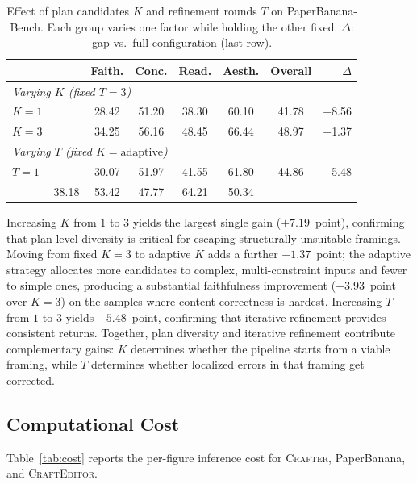\documentclass{article}
\newcommand{\Crafter}{\textsc{Crafter}\xspace}
\newcommand{\Editor}{\textsc{CraftEditor}\xspace}
\newcommand{\PaperBananaBench}{PaperBanana-Bench\xspace}
\begin{document}
\begin{table}[h]
\centering
\small
\caption{Effect of plan candidates $K$ and refinement rounds $T$ on \PaperBananaBench. Each group varies one factor while holding the other fixed. $\Delta$: gap vs.\ full configuration (last row).}
\label{tab:scaling-kt}
\begin{tabular}{@{}ll ccccc r@{}}
\toprule
& & \textbf{Faith.} & \textbf{Conc.} & \textbf{Read.} & \textbf{Aesth.} & \textbf{Overall} & \textbf{$\Delta$} \\
\midrule
\multicolumn{8}{l}{\emph{Varying $K$ (fixed $T{=}3$)}} \\
$K{=}1$        && 28.42 & 51.20 & 38.30 & 60.10 & 41.78 & $-$8.56 \\
$K{=}3$        && 34.25 & 56.16 & 48.45 & 66.44 & 48.97 & $-$1.37 \\
\midrule
\multicolumn{8}{l}{\emph{Varying $T$ (fixed $K{=}\text{adaptive}$)}} \\
$T{=}1$        && 30.07 & 51.97 & 41.55 & 61.80 & 44.86 & $-$5.48 \\
\midrule
\rowcolor{blue!5}
\multicolumn{2}{l}{\textbf{Full} ($K{=}\text{adaptive},\; T{=}3$)} & 38.18 & 53.42 & 47.77 & 64.21 & 50.34 & \\
\bottomrule
\end{tabular}
\end{table}

Increasing $K$ from $1$ to $3$ yields the largest single gain ($+7.19$~point), confirming that plan-level diversity is critical for escaping structurally unsuitable framings. Moving from fixed $K{=}3$ to adaptive $K$ adds a further $+1.37$~point; the adaptive strategy allocates more candidates to complex, multi-constraint inputs and fewer to simple ones, producing a substantial faithfulness improvement ($+3.93$~point over $K{=}3$) on the samples where content correctness is hardest. Increasing $T$ from $1$ to $3$ yields $+5.48$~point, confirming that iterative refinement provides consistent returns. Together, plan diversity and iterative refinement contribute complementary gains: $K$ determines whether the pipeline starts from a viable framing, while $T$ determines whether localized errors in that framing get corrected.

\subsection{Computational Cost}
\label{app:cost}

Table~\ref{tab:cost} reports the per-figure inference cost for \Crafter, PaperBanana, and \Editor.
\end{document}
